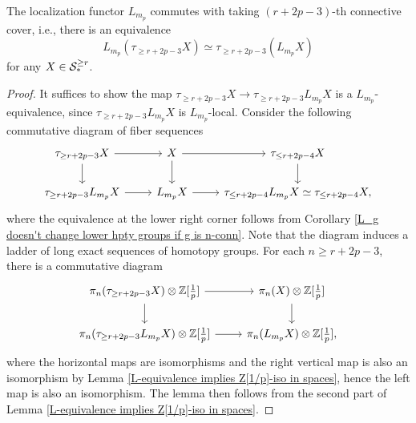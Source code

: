 \begin{lemma}
\label{m_p localization commutes with k-th connective cover}
	The localization functor $L_{m_p}$ commutes with taking $(r+2p-3)$-th connective cover, i.e., there is an equivalence
	$$
	L_{m_p}(\tau_{\geq r+2p-3}X)\simeq \tau_{\geq r+2p-3}(L_{m_p} X)
	$$
	for any $X\in {\mathcal{S}}^{\geq r}_*$.
\end{lemma}
\begin{proof}
	It suffices to show the map $\tau_{\geq r+2p-3}X\to \tau_{\geq r+2p-3}L_{m_{p}}X$ is a $L_{m_p}$-equivalence, since $\tau_{\geq r+2p-3}L_{m_{p}}X$ is $L_{m_p}$-local. Consider the following commutative diagram of fiber sequences
	\[
	\begin{tikzcd}
		\tau_{\geq r+2p-3}X & X & \tau_{\leq r+2p-4}X    \\
		\tau_{\geq r+2p-3}L_{m_p}X & L_{m_p}X & \tau_{\leq r+2p-4} L_{m_p}X\simeq \tau_{\leq r+2p-4}X,
		\arrow[from=1-1, to=1-2]
		\arrow[from=2-1, to=2-2]
		\arrow[from=1-3, to=2-3]
		\arrow[from=1-2, to=1-3]
		\arrow[from=2-2, to=2-3]
		\arrow[from=1-1, to=2-1]
		\arrow[from=1-2, to=2-2]
	\end{tikzcd}
	\]
	where the equivalence at the lower right corner follows from Corollary \ref{L_g doesn't change lower hpty groups if g is n-conn}.
	Note that the diagram induces a ladder of long exact sequences of homotopy groups. For each $n\geq r+2p-3$, there is a commutative diagram
	\[
	\begin{tikzcd}
		\pi_{n}(\tau_{\geq r+2p-3}X)\otimes \BZ[\frac{1}{p}] & \pi_{n}(X) \otimes \BZ[\frac{1}{p}] \\
		\pi_{n}(\tau_{\geq r+2p-3}L_{m_p}X)\otimes \BZ[\frac{1}{p}]  & \pi_{n}(L_{m_p}X)\otimes \BZ[\frac{1}{p}] 
		\arrow[from=1-1, to=1-2]
		\arrow[from=2-1, to=2-2]
		\arrow[from=1-1, to=2-1]
		\arrow[from=1-2, to=2-2],
	\end{tikzcd}
	\]
	where the horizontal maps are isomorphisms and the right vertical map is also an isomorphism by Lemma \ref{L-equivalence implies Z[1/p]-iso in spaces}, hence the left map is also an isomorphism.
	The lemma then follows from the second part of Lemma \ref{L-equivalence implies Z[1/p]-iso in spaces}.
	
\end{proof}
	

